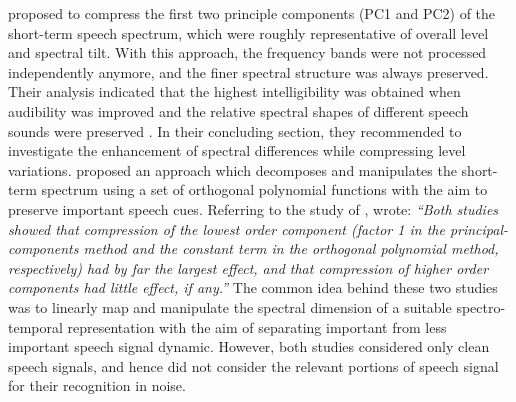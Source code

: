 \documentclass[10pt,a4paper,twocolumn]{article}
\begin{document}
\cite{bustamante1987} proposed to compress the first two principle components (PC1 and PC2) of the short-term speech spectrum, which were roughly representative of overall level and spectral tilt.
%
With this approach, the frequency bands were not processed independently anymore, and the finer spectral structure was always preserved.
%
Their analysis indicated that the highest intelligibility was obtained when audibility was improved and the relative spectral shapes of different speech sounds were preserved \citep{bustamante1987}.
%
In their concluding section, they recommended to investigate the enhancement of spectral differences while compressing level variations.
%
\cite{levitt1991} proposed an approach which decomposes and manipulates the short-term spectrum using a set of orthogonal polynomial functions with the aim to preserve important speech cues.
%
Referring to the study of \cite{bustamante1987}, \cite{levitt1991} wrote: \emph{\enquote{Both studies showed that compression of the lowest order component (factor 1 in the principal-components method and the constant term in the orthogonal polynomial method, respectively) had by far the largest effect, and that compression of higher order components had little effect, if any.}}
%
The common idea behind these two studies was to linearly map and manipulate the spectral dimension of a suitable spectro-temporal representation with the aim of separating important from less important speech signal dynamic.
%
However, both studies considered only clean speech signals, and hence did not consider the relevant portions of speech signal for their recognition in noise.
\end{document}
